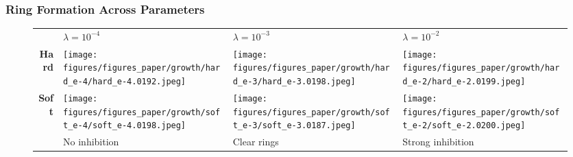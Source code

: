 \documentclass[10pt,t]{beamer}
\begin{document}
\begin{frame}
    \frametitle{Ring Formation Across Parameters}

    \vspace{-0.3cm}
    \begin{figure}
        \centering
        \begin{tabular}{r M{0.25\textwidth} M{0.25\textwidth} M{0.25\textwidth}}
                                                                                                             & $\lambda = 10^{-4}$   & $\lambda = 10^{-3}$      & $\lambda = 10^{-2}$
            \\[3pt]
            \textbf{Hard}                                                                                    &
            \texttt{[image: figures/figures\_paper/growth/hard\_e-4/hard\_e-4.0192.jpeg]} &
            \texttt{[image: figures/figures\_paper/growth/hard\_e-3/hard\_e-3.0198.jpeg]} &
            \texttt{[image: figures/figures\_paper/growth/hard\_e-2/hard\_e-2.0199.jpeg]}                                                                               \\[3pt]

            \textbf{Soft}                                                                                    &
            \texttt{[image: figures/figures\_paper/growth/soft\_e-4/soft\_e-4.0198.jpeg]} &
            \texttt{[image: figures/figures\_paper/growth/soft\_e-3/soft\_e-3.0187.jpeg]} &
            \texttt{[image: figures/figures\_paper/growth/soft\_e-2/soft\_e-2.0200.jpeg]}                                                                               \\[3pt]

                                                                                                             & \scriptsize{No inhibition} & \scriptsize{Clear rings} & \scriptsize{Strong inhibition}
        \end{tabular}
    \end{figure}

\end{frame}
\end{document}
